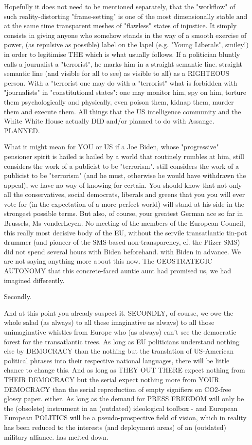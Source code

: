 \begin{multicols}{2}
Hopefully it does not need to be mentioned separately,
that the "workflow" of such reality-distorting
"frame-setting" is one of the most dimensionally stable and at the same time
transparent meshes of "flawless" states of injustice. It simply consists in giving anyone who somehow stands in the way of a smooth exercise of power,
(as repulsive as possible) label on the lapel (e.g. "Young Liberals", smiley!) in order to legitimise THE
which is what usually follows.
If a politician bluntly calls a journalist a "terrorist", he marks him in a straight semantic line.
straight semantic line (and visible for all to see) as
visible to all) as a RIGHTEOUS person. With a "terrorist
one may do with a "terrorist" what is forbidden with "journalists" in "constitutional states": one may monitor him, spy on him,
torture them psychologically and physically, even poison them, kidnap them, murder them and execute them. All things
that the US intelligence community and the White
White House actually DID and/or planned to do with Assange.
PLANNED.

What it might mean for YOU or US if a
Joe Biden, whose "progressive" pensioner spirit is hailed
is hailed by a world that routinely rumbles at him, still considers the work of a publicist to be "terrorism".
still considers the work of a publicist to be "terrorism" (and he must,
otherwise he would have withdrawn the appeal),
we have no way of knowing for certain. You
should know that not only all the conservatives, social democrats, liberals and greens that you
you will ever vote for (in the expectation of a more perfect world)
will stand at his side in the strongest possible terms. But also, of course, your greatest German ace so far in
Brussels, Ms vonderLeyen. No meeting of the
members of the European Council, this really most decisive body of the EU, without the servile
transatlantic tin-pot drummer (and pioneer of the
SMS-based non-transparency, cf. the Pfizer SMS) did not spend
several hours with Biden beforehand.
with Biden in advance. We are not saying anything more about this now. The GEOSTRATEGIC AUTONOMY that this concrete-faced auntie
aunt had promised us, we had imagined differently.

Secondly.

And at this point you already suspect it. SECONDLY, of course, we owe the whole salad (as always) to all these imaginative
as always) to all those unimaginative whistles from Europe who (as always) can't see the democratic forest for the transatlantic trees. As long as
EU politicians understand nothing else by DEMOCRACY than the
nothing but the translation of US-American political phrases into their respective national languages,
there will be little chance to change this. And as long as THEY OUT THERE expect nothing from THEIR DEMOCRACY but the serial
expect nothing more from YOUR DEMOCRACY than the serial reproduction of empty signifiers on CO2-free glossy paper.
either. As long as the demand for PRESS FREEDOM will only be the (obsolete) instrument in an
(outdated) ideological toolbox - and European
European POLITICS will be a pseudo-prospective field of vision, which in reality has been reduced to the interests (and deployment areas) of an (outdated) military alliance.
has melted down.


\end{multicols}
